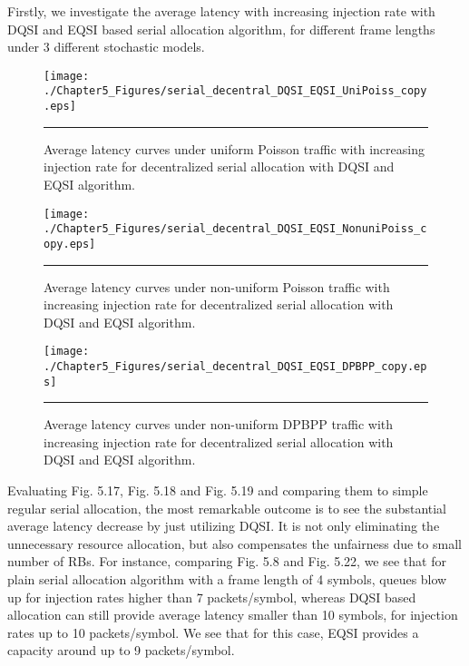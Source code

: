 Firstly, we investigate the average latency with increasing injection rate with DQSI and EQSI based serial allocation algorithm, for different frame lengths under 3 different stochastic models. 

\begin{figure}[htbp]
  \centering
    \texttt{[image: ./Chapter5\_Figures/serial\_decentral\_DQSI\_EQSI\_UniPoiss\_copy.eps]}
    \rule{35em}{0.5pt}
  \caption[Decentralized Serial allocation with DQSI and EQSI average latency under uniform Poisson]{Average latency curves under uniform Poisson traffic with increasing injection rate for decentralized serial allocation with DQSI and EQSI algorithm.}
  \label{fig:Electron}
\end{figure}


\begin{figure}[htbp]
  \centering
    \texttt{[image: ./Chapter5\_Figures/serial\_decentral\_DQSI\_EQSI\_NonuniPoiss\_copy.eps]}
    \rule{35em}{0.5pt}
  \caption[Decentralized Serial DQSI and EQSI allocation average latency under non-uniform Poisson]{Average latency curves under non-uniform Poisson traffic with increasing injection rate for decentralized serial allocation with DQSI and EQSI algorithm.}
  \label{fig:Electron}
\end{figure}


\begin{figure}[htbp]
  \centering
    \texttt{[image: ./Chapter5\_Figures/serial\_decentral\_DQSI\_EQSI\_DPBPP\_copy.eps]}
    \rule{35em}{0.5pt}
  \caption[Decentralized Serial DQSI and EQSI allocation average latency under non-uniform DPBPP]{Average latency curves under non-uniform DPBPP traffic with increasing injection rate for decentralized serial allocation with DQSI and EQSI algorithm.}
  \label{fig:Electron} 
\end{figure}

Evaluating Fig. 5.17, Fig. 5.18 and Fig. 5.19 and comparing them to simple regular serial allocation, the most remarkable outcome is to see the substantial average latency decrease by just utilizing DQSI. It is not only eliminating the unnecessary resource allocation, but also compensates the unfairness due to small number of RBs. For instance, comparing Fig. 5.8 and Fig. 5.22, we see that for plain serial allocation algorithm with a frame length of 4 symbols, queues blow up for injection rates higher than 7 packets/symbol, whereas DQSI based allocation can still provide average latency smaller than 10 symbols, for injection rates up to 10 packets/symbol. We see that for this case, EQSI provides a capacity around up to 9 packets/symbol. 

